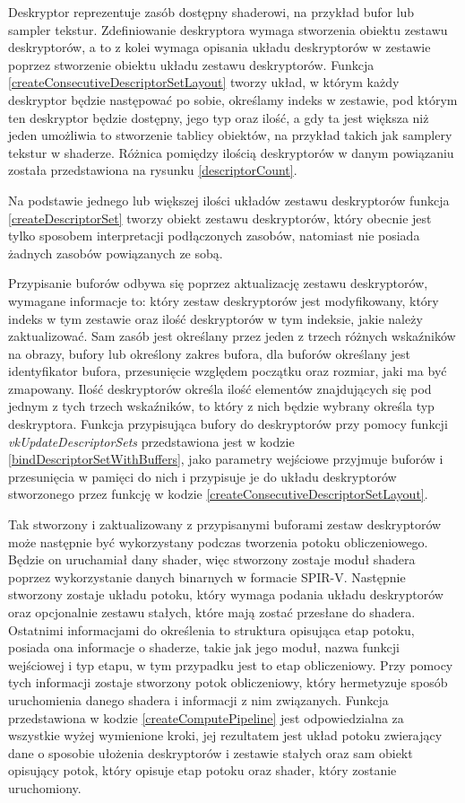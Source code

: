 Deskryptor reprezentuje zasób dostępny shaderowi, na przykład bufor lub sampler tekstur.
Zdefiniowanie deskryptora wymaga stworzenia obiektu zestawu deskryptorów, a to z kolei wymaga opisania układu deskryptorów w zestawie poprzez stworzenie obiektu układu zestawu deskryptorów.
Funkcja \ref{createConsecutiveDescriptorSetLayout} tworzy układ, w którym każdy deskryptor będzie następować po sobie, określamy indeks w zestawie, pod którym ten deskryptor będzie dostępny, jego typ oraz ilość, a gdy ta jest większa niż jeden umożliwia to stworzenie tablicy obiektów, na przykład takich jak samplery tekstur w shaderze.
Różnica pomiędzy ilością deskryptorów w danym powiązaniu została przedstawiona na rysunku \ref{descriptorCount}.

Na podstawie jednego lub większej ilości układów zestawu deskryptorów funkcja \ref{createDescriptorSet} tworzy obiekt zestawu deskryptorów, który obecnie jest tylko sposobem interpretacji podłączonych zasobów, natomiast nie posiada żadnych zasobów powiązanych ze sobą.

Przypisanie buforów odbywa się poprzez aktualizację zestawu deskryptorów, wymagane informacje to: który zestaw deskryptorów jest modyfikowany, który indeks w tym zestawie oraz ilość deskryptorów w tym indeksie, jakie należy zaktualizować.
Sam zasób jest określany przez jeden z trzech różnych wskaźników na obrazy, bufory lub określony zakres bufora, dla buforów określany jest identyfikator bufora, przesunięcie względem początku oraz rozmiar, jaki ma być zmapowany.
Ilość deskryptorów określa ilość elementów znajdujących się pod jednym z tych trzech wskaźników, to który z nich będzie wybrany określa typ deskryptora.
Funkcja przypisująca bufory do deskryptorów przy pomocy funkcji \textit{vkUpdateDescriptorSets} przedstawiona jest w kodzie \ref{bindDescriptorSetWithBuffers}, jako parametry wejściowe przyjmuje buforów i przesunięcia w pamięci do nich i przypisuje je do układu deskryptorów stworzonego przez funkcję w kodzie \ref{createConsecutiveDescriptorSetLayout}.

Tak stworzony i zaktualizowany z przypisanymi buforami zestaw deskryptorów może następnie być wykorzystany podczas tworzenia potoku obliczeniowego.
Będzie on uruchamiał dany shader, więc stworzony zostaje moduł shadera poprzez wykorzystanie danych binarnych w formacie SPIR-V.
Następnie stworzony zostaje układu potoku, który wymaga podania układu deskryptorów oraz opcjonalnie zestawu stałych, które mają zostać przesłane do shadera.
Ostatnimi informacjami do określenia to struktura opisująca etap potoku, posiada ona informacje o shaderze, takie jak jego moduł, nazwa funkcji wejściowej i typ etapu, w tym przypadku jest to etap obliczeniowy.
Przy pomocy tych informacji zostaje stworzony potok obliczeniowy, który hermetyzuje sposób uruchomienia danego shadera i informacji z nim związanych.
Funkcja przedstawiona w kodzie \ref{createComputePipeline} jest odpowiedzialna za wszystkie wyżej wymienione kroki, jej rezultatem jest układ potoku zwierający dane o sposobie ułożenia deskryptorów i zestawie stałych oraz sam obiekt opisujący potok, który opisuje etap potoku oraz shader, który zostanie uruchomiony.

